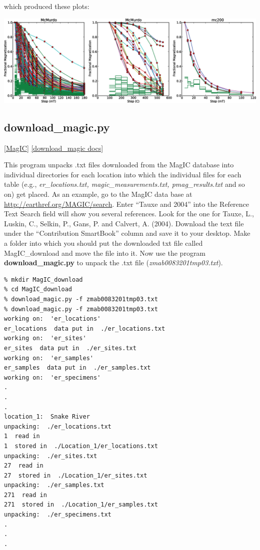 \documentclass[11pt]{book}
\begin{document}
{{{\noindent which produced these plots:

\includegraphics[width=15cm]{EPSfiles/dmag.eps}

 \subsection{download\_magic.py} [\href{http://earthref.org/MagIC}{MagIC}]
\href{http://earthref.org/PmagPy/pmagpydocs/download_magic-module.html}{[download\_magic docs]}
 
 This program unpacks .txt files downloaded from the MagIC database into individual directories for each location into which the individual files for each table (e.g., {\it er\_locations.txt, magic\_measurements.txt, pmag\_results.txt} and so on) get placed.   As an example, go to the MagIC data base at \url{http://earthref.org/MAGIC/search}.  Enter ``Tauxe and 2004'' into the Reference Text Search field will show you several references.   Look for the one for Tauxe, L., Luskin, C., Selkin, P., Gans, P. and Calvert, A. (2004). \nocite{tauxe04b}  Download the  text file under the ``Contribution SmartBook'' column and save it to your desktop.   Make a   folder into which  you should put the downloaded txt file called MagIC\_download and move the file into it.  Now use the program {\bf download\_magic.py} to unpack the .txt file ({\it zmab0083201tmp03.txt}).   
 
 \begin{verbatim}
% mkdir MagIC_download
% cd MagIC_download
% download_magic.py -f zmab0083201tmp03.txt
% download_magic.py -f zmab0083201tmp03.txt 
working on:  'er_locations'
er_locations  data put in  ./er_locations.txt
working on:  'er_sites'
er_sites  data put in  ./er_sites.txt
working on:  'er_samples'
er_samples  data put in  ./er_samples.txt
working on:  'er_specimens'
.
.
.
location_1:  Snake River
unpacking:  ./er_locations.txt
1  read in
1  stored in  ./Location_1/er_locations.txt
unpacking:  ./er_sites.txt
27  read in
27  stored in  ./Location_1/er_sites.txt
unpacking:  ./er_samples.txt
271  read in
271  stored in  ./Location_1/er_samples.txt
unpacking:  ./er_specimens.txt
.
.
.
\end{verbatim}

}}}
\end{document}

